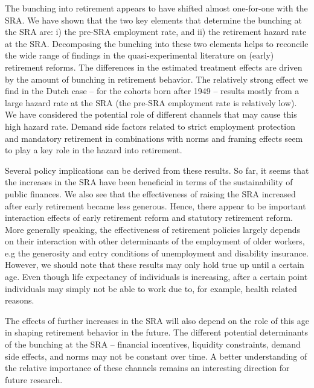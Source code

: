 \documentclass[12pt,a4paper]{article}
\begin{document}
The bunching into retirement appears to have shifted almost one-for-one with the SRA. We have shown that the two key elements that determine the bunching at the SRA are: i) the pre-SRA employment rate, and ii) the retirement hazard rate at the SRA. Decomposing the bunching into these two elements helps to reconcile the wide range of findings in the quasi-experimental literature on (early) retirement reforms. The differences in the estimated treatment effects are driven by the amount of bunching in retirement behavior. The relatively strong effect we find in the Dutch case -- for the cohorts born after 1949 -- results mostly from a large hazard rate at the SRA (the pre-SRA employment rate is relatively low). We have considered the potential role of different channels that may cause this high hazard rate. Demand side factors related to strict employment protection and mandatory retirement in combinations with norms and framing effects seem to play a key role in the hazard into retirement.   

Several policy implications can be derived from these results. So far, it seems that the increases in the SRA have been beneficial in terms of the sustainability of public finances. We also see that the effectiveness of raising the SRA increased after early retirement became less generous. Hence, there appear to be important interaction effects of early retirement reform and statutory retirement reform. More generally speaking, the effectiveness of retirement policies largely depends on their interaction with other determinants of the employment of older workers, e.g the generosity and entry conditions of unemployment and disability insurance.  However, we should note that these results may only hold true up until a certain age. Even though life expectancy of individuals is increasing, after a certain point individuals may simply not be able to work due to, for example, health related reasons. 

The effects of further increases in the SRA will also depend on the role of this age in shaping retirement behavior in the future. The different potential determinants of the bunching at the SRA -- financial incentives, liquidity constraints, demand side effects, and norms may not be constant over time. A better understanding of the relative importance of these channels remains an interesting direction for future research. 


%

\newpage
\appendix
\end{document}
